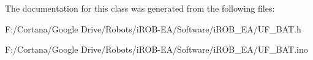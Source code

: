 The documentation for this class was generated from the following files\+:\begin{DoxyCompactItemize}
\item 
F\+:/\+Cortana/\+Google Drive/\+Robots/i\+R\+O\+B-\/\+E\+A/\+Software/i\+R\+O\+B\+\_\+\+E\+A/U\+F\+\_\+\+B\+A\+T.\+h\item 
F\+:/\+Cortana/\+Google Drive/\+Robots/i\+R\+O\+B-\/\+E\+A/\+Software/i\+R\+O\+B\+\_\+\+E\+A/U\+F\+\_\+\+B\+A\+T.\+ino\end{DoxyCompactItemize}
